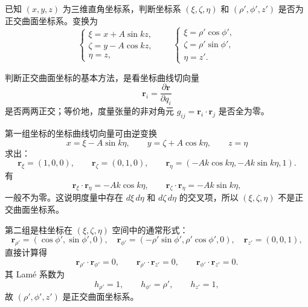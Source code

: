 ﻿


\begin{question}
已知 \((x,y,z)\) 为三维直角坐标系，判断坐标系 \((\xi,\zeta,\eta)\) 和 \((\rho',\phi',z')\) 是否为正交曲面坐标系。变换为
\[
\begin{cases}
\xi=x+A\sin kz,\\
\zeta=y-A\cos kz,\\
\eta=z,
\end{cases}
\qquad
\begin{cases}
\xi=\rho'\cos\phi',\\
\zeta=\rho'\sin\phi',\\
\eta=z'.
\end{cases}
\]
\begin{solution}
判断正交曲面坐标的基本方法，是看坐标曲线切向量
\[
\bm r_i=\frac{\partial\bm r}{\partial q_i}
\]
是否两两正交；等价地，度量张量的非对角元 \(g_{ij}=\bm r_i\cdot\bm r_j\) 是否全为零。

第一组坐标的坐标曲线切向量可由逆变换
\[
x=\xi-A\sin k\eta,\qquad y=\zeta+A\cos k\eta,\qquad z=\eta
\]
求出：
\[
\bm r_\xi=(1,0,0),\qquad
\bm r_\zeta=(0,1,0),\qquad
\bm r_\eta=(-Ak\cos k\eta,-Ak\sin k\eta,1).
\]
有
\[
\bm r_\xi\cdot\bm r_\eta=-Ak\cos k\eta,\qquad
\bm r_\zeta\cdot\bm r_\eta=-Ak\sin k\eta,
\]
一般不为零。这说明度量中存在 \(d\xi\,d\eta\) 和 \(d\zeta\,d\eta\) 的交叉项，所以 \((\xi,\zeta,\eta)\) 不是正交曲面坐标系。

第二组是柱坐标在 \((\xi,\zeta,\eta)\) 空间中的通常形式：
\[
\bm r_{\rho'}=(\cos\phi',\sin\phi',0),\quad
\bm r_{\phi'}=(-\rho'\sin\phi',\rho'\cos\phi',0),\quad
\bm r_{z'}=(0,0,1),
\]
直接计算得
\[
\bm r_{\rho'}\cdot\bm r_{\phi'}=0,\qquad
\bm r_{\rho'}\cdot\bm r_{z'}=0,\qquad
\bm r_{\phi'}\cdot\bm r_{z'}=0.
\]
其 Lamé 系数为
\[
h_{\rho'}=1,\qquad h_{\phi'}=\rho',\qquad h_{z'}=1,
\]
故 \((\rho',\phi',z')\) 是正交曲面坐标系。
\end{solution}
\end{question}

